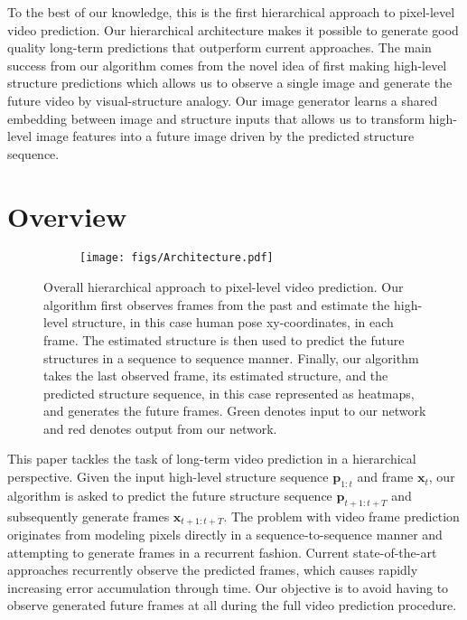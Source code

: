 \documentclass{article}
\newcommand{\x}{{\mathbf{x}}}
\newcommand{\p}{{\mathbf{p}}}
\newcommand{\cutsectionup}{\vspace*{-0.1in}}
\newcommand{\cutsectiondown}{\vspace*{-0.05in}}
\newcommand{\cutsectionup}{}
\newcommand{\cutsectiondown}{}
\begin{document}
To the best of our knowledge, this is the first hierarchical approach to pixel-level video prediction.
Our hierarchical architecture makes it possible to generate good quality long-term predictions that outperform current approaches.
The main success from our algorithm comes from the novel idea of first making high-level structure predictions which allows us to observe a single image and generate the future video by visual-structure analogy.
Our image generator learns a shared embedding between image and structure inputs that allows us to transform high-level image features into a future image driven by the predicted structure sequence.
\cutsectionup\section{Overview}\label{sec:overview}\cutsectiondown\begin{figure*}[t]
    \begin{subfigure}{1\linewidth}
        \centering
	    \texttt{[image: figs/Architecture.pdf]}
	\end{subfigure} 
    \vspace{-0.15in}
    \caption{Overall hierarchical approach to pixel-level video prediction. Our algorithm first observes frames from the past and estimate the high-level structure, in this case human pose xy-coordinates, in each frame. The estimated structure is then used to predict the future structures in a sequence to sequence manner. Finally, our algorithm takes the last observed frame, its estimated structure, and the predicted structure sequence, in this case represented as heatmaps, and generates the future frames. Green denotes input to our network and red denotes output from our network.}
\label{fig:arch}
\vspace{-0.1in}
\end{figure*}%
This paper tackles the task of long-term video prediction in a hierarchical perspective.
Given the input high-level structure sequence $\p_{1:t}$ and frame $\x_t$, our algorithm is asked to predict the future structure sequence $\p_{t+1:t+T}$ and subsequently generate frames $\x_{t+1:t+T}$.
The problem with video frame prediction originates from modeling pixels directly in a sequence-to-sequence manner and attempting to generate frames in a recurrent fashion.
Current state-of-the-art approaches recurrently observe the predicted frames, which causes rapidly increasing error accumulation through time.
Our objective is to avoid having to observe generated future frames at all during the full video prediction procedure.
\end{document}
